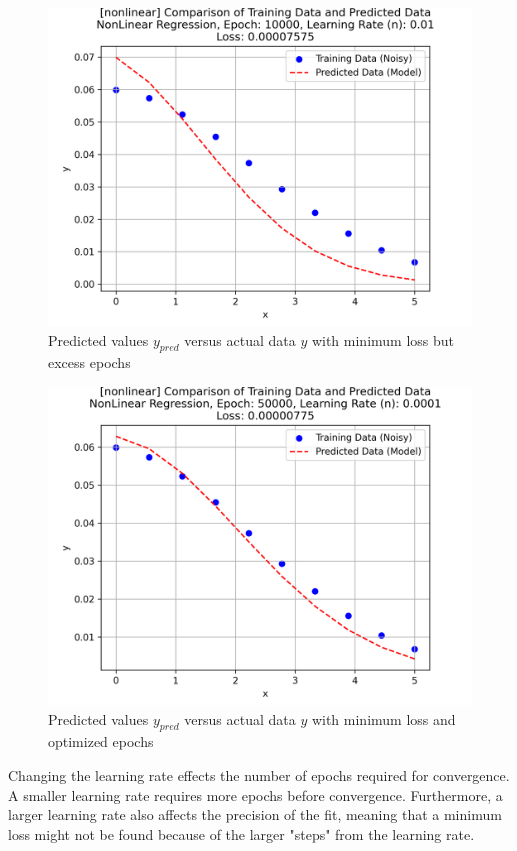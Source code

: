 \documentclass[letterpaper, 10 pt, conference]{ieeeconf}  %
\begin{document}
\begin{figure}[h!]
   \centering
   \includegraphics[width=0.8\linewidth]{../Figures/nonlinear_regression_e_10000_n_0.01.png}
   \caption{Predicted values $y_{pred}$ versus actual data $y$ with minimum loss but excess epochs}
   \label{fig:NonLin_b_less_n}
\end{figure}

\begin{figure}[h!]
   \centering
   \includegraphics[width=0.8\linewidth]{../Figures/nonlinear_regression_e_50000_n_0.0001.png}
   \caption{Predicted values $y_{pred}$ versus actual data $y$ with minimum loss and optimized epochs}
   \label{fig:NonLin_b_min_loss}
\end{figure}

Changing the learning rate effects the number of epochs required for convergence. 
A smaller learning rate requires more epochs before convergence.
Furthermore, a larger learning rate also affects the precision of the fit, meaning that a minimum loss might not be found because of the larger "steps" from the learning rate. 
\end{document}
